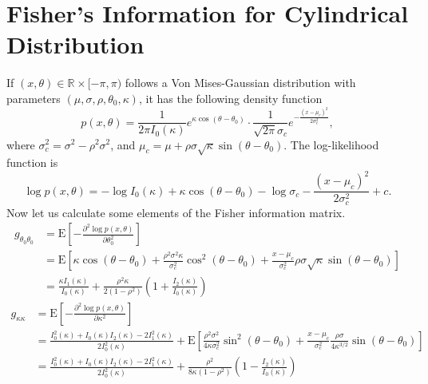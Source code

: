 \documentclass[10pt]{article}
\newcommand{\expect}[1]{\ensuremath{\mathrm{E}\left[ #1 \right]}}
\newcommand{\real}[1]{\ensuremath{\mathbb{R}^{ #1 }}}
\begin{document}
\section{Fisher's Information for Cylindrical Distribution}
If $(x,\theta)\in\real{}\times[-\pi,\pi)$ follows a Von Mises-Gaussian distribution with parameters $(\mu,\sigma,\rho,\theta_0,\kappa)$, it has the following density function
\begin{equation}
	p(x,\theta) = \frac{1}{2\pi I_0(\kappa)}e^{\kappa\cos(\theta-\theta_0)} \cdot \frac{1}{\sqrt{2\pi}\sigma_c}e^{-\frac{(x-\mu_c)^2}{2\sigma_c^2}},
\end{equation}
where $\sigma_c^2 = \sigma^2-\rho^2\sigma^2$, and $\mu_c = \mu + \rho\sigma\sqrt{\kappa}\sin(\theta-\theta_0)$.
The log-likelihood function is
\begin{equation} \label{eqn:VMGLogLikelihood}
	\log p(x,\theta) = -\log I_0(\kappa) + \kappa\cos(\theta-\theta_0) - \log\sigma_c - \frac{(x-\mu_c)^2}{2\sigma_c^2} + c.
\end{equation}
Now let us calculate some elements of the Fisher information matrix.
\begin{align}
	g_{\theta_0\theta_0} &= \expect{-\frac{\partial^2 \log p(x,\theta)}{\partial \theta_0^2}} \nonumber \\
	&= \expect{\kappa\cos(\theta-\theta_0) + \frac{\rho^2\sigma^2\kappa}{\sigma_c^2}\cos^2(\theta-\theta_0) + \frac{x-\mu_c}{\sigma_c^2}\rho\sigma\sqrt{\kappa}\sin(\theta-\theta_0)} \nonumber \\
	&= \frac{\kappa I_1(\kappa)}{I_0(\kappa)} + \frac{\rho^2\kappa}{2(1-\rho^2)}\left(1+\frac{I_2(\kappa)}{I_0(\kappa)}\right)
\end{align}
\begin{align}
	g_{\kappa\kappa} &= \expect{-\frac{\partial^2 \log p(x,\theta)}{\partial \kappa^2}} \nonumber \\
	&= \frac{I_0^2(\kappa)+I_0(\kappa)I_2(\kappa)-2I_1^2(\kappa)}{2I^2_0(\kappa)} + \expect{\frac{\rho^2\sigma^2}{4\kappa\sigma_c^2}\sin^2(\theta-\theta_0) + \frac{x-\mu_c}{\sigma_c^2}\frac{\rho\sigma}{4\kappa^{3/2}}\sin(\theta-\theta_0)} \nonumber \\
	&= \frac{I_0^2(\kappa)+I_0(\kappa)I_2(\kappa)-2I_1^2(\kappa)}{2I^2_0(\kappa)} + \frac{\rho^2}{8\kappa(1-\rho^2)}\left(1 - \frac{I_2(\kappa)}{I_0(\kappa)}\right)
\end{align}
\end{document}
